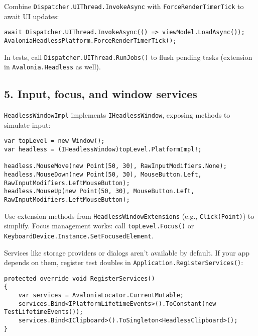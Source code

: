 Combine \passthrough{\lstinline!Dispatcher.UIThread.InvokeAsync!} with
\passthrough{\lstinline!ForceRenderTimerTick!} to await UI updates:

\begin{lstlisting}
await Dispatcher.UIThread.InvokeAsync(() => viewModel.LoadAsync());
AvaloniaHeadlessPlatform.ForceRenderTimerTick();
\end{lstlisting}

In tests, call \passthrough{\lstinline!Dispatcher.UIThread.RunJobs()!}
to flush pending tasks (extension in
\passthrough{\lstinline!Avalonia.Headless!} as well).

\subsection{5. Input, focus, and window
services}\label{input-focus-and-window-services}

\passthrough{\lstinline!HeadlessWindowImpl!} implements
\passthrough{\lstinline!IHeadlessWindow!}, exposing methods to simulate
input:

\begin{lstlisting}
var topLevel = new Window();
var headless = (IHeadlessWindow)topLevel.PlatformImpl!;

headless.MouseMove(new Point(50, 30), RawInputModifiers.None);
headless.MouseDown(new Point(50, 30), MouseButton.Left, RawInputModifiers.LeftMouseButton);
headless.MouseUp(new Point(50, 30), MouseButton.Left, RawInputModifiers.LeftMouseButton);
\end{lstlisting}

Use extension methods from
\passthrough{\lstinline!HeadlessWindowExtensions!} (e.g.,
\passthrough{\lstinline!Click(Point)!}) to simplify. Focus management
works: call \passthrough{\lstinline!topLevel.Focus()!} or
\passthrough{\lstinline!KeyboardDevice.Instance.SetFocusedElement!}.

Services like storage providers or dialogs aren't available by default.
If your app depends on them, register test doubles in
\passthrough{\lstinline!Application.RegisterServices()!}:

\begin{lstlisting}
protected override void RegisterServices()
{
    var services = AvaloniaLocator.CurrentMutable;
    services.Bind<IPlatformLifetimeEvents>().ToConstant(new TestLifetimeEvents());
    services.Bind<IClipboard>().ToSingleton<HeadlessClipboard>();
}
\end{lstlisting}

